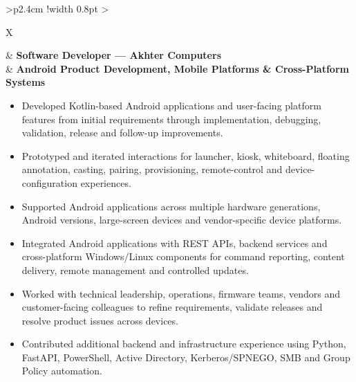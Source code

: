 \documentclass[11pt,a4paper]{article}
\begin{document}
\renewcommand{\arraystretch}{1.08}
\begin{tabularx}{\textwidth}{>{\raggedleft\arraybackslash}p{2.4cm} !{\color{timelinegray}\vrule width 0.8pt} >{\raggedright\arraybackslash}X}
\textbf{\color{timelineblue}} &
\textbf{Software Developer --- Akhter Computers}\\
& {\small\color{timelinegray}\textbf{Android Product Development, Mobile Platforms \& Cross-Platform Systems}}
\par{\footnotesize
\begin{itemize}
    \item Developed Kotlin-based Android applications and user-facing platform features from initial requirements through implementation, debugging, validation, release and follow-up improvements.
    \item Prototyped and iterated interactions for launcher, kiosk, whiteboard, floating annotation, casting, pairing, provisioning, remote-control and device-configuration experiences.
    \item Supported Android applications across multiple hardware generations, Android versions, large-screen devices and vendor-specific device platforms.
    \item Integrated Android applications with REST APIs, backend services and cross-platform Windows/Linux components for command reporting, content delivery, remote management and controlled updates.
    \item Worked with technical leadership, operations, firmware teams, vendors and customer-facing colleagues to refine requirements, validate releases and resolve product issues across devices.
    \item Contributed additional backend and infrastructure experience using Python, FastAPI, PowerShell, Active Directory, Kerberos/SPNEGO, SMB and Group Policy automation.
\end{itemize}} \\[3pt]


\end{tabularx}
\end{document}
